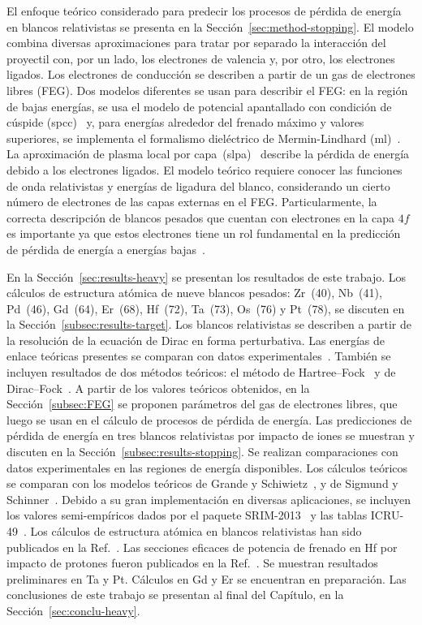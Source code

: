 El enfoque teórico considerado para predecir los procesos de pérdida de 
energía en blancos relativistas se presenta en la 
Sección~\ref{sec:method-stopping}. El modelo combina diversas 
aproximaciones para tratar por separado la interacción del proyectil 
con, por un lado, los electrones de valencia y, por otro, los electrones 
ligados. Los electrones de conducción se describen a partir de un 
gas de electrones libres (FEG). Dos modelos diferentes se usan para 
describir el FEG: en la región de bajas energías, se usa el modelo de 
potencial apantallado con condición de cúspide 
(\acs{spcc})~\cite{Montanari:17} y, para energías alrededor del frenado 
máximo y valores superiores, se implementa el formalismo dieléctrico de 
Mermin-Lindhard (\acs{ml})~\cite{Mermin:70}. La aproximación de plasma 
local por capa~(\acs{slpa})~\cite{Montanari:13} describe la pérdida de 
energía debido a los electrones ligados. El modelo teórico requiere 
conocer las funciones de onda relativistas y energías de ligadura del 
blanco, considerando un cierto número de electrones de las capas 
externas en el FEG. Particularmente, la correcta descripción de blancos 
pesados que cuentan con electrones en la capa $4f$ es importante ya que 
estos electrones tiene un rol fundamental en la predicción de pérdida de 
energía a energías bajas~\cite{Roth:17}. 

En la Sección~\ref{sec:results-heavy} se presentan los resultados de 
este trabajo. Los cálculos de estructura atómica de nueve blancos 
pesados: Zr~(40), Nb~(41), Pd~(46), Gd~(64), Er~(68), Hf~(72), Ta~(73), 
Os~(76) y Pt~(78), se discuten en la 
Sección~\ref{subsec:results-target}. Los blancos relativistas se 
describen a partir de la resolución de la ecuación de Dirac en forma 
perturbativa. Las energías de enlace teóricas presentes se comparan con 
datos experimentales~\cite{Williams:95}. También se incluyen resultados 
de dos métodos teóricos: el método de 
Hartree--Fock~\cite{FroeseFischer:97} y de 
Dirac--Fock~\cite{Desclaux:73}. A partir de los valores teóricos 
obtenidos, en la Sección~\ref{subsec:FEG} se proponen parámetros del gas 
de electrones libres, que luego se usan en el cálculo de procesos de 
pérdida de energía. 
Las predicciones de pérdida de energía en tres blancos relativistas por 
impacto de iones se muestran y discuten en la 
Sección~\ref{subsec:results-stopping}. Se realizan comparaciones con 
datos experimentales en las regiones de energía disponibles. Los 
cálculos teóricos se comparan con los modelos teóricos de Grande y 
Schiwietz~\cite{Grande:01,casp52}, y de Sigmund y 
Schinner~\cite{DPASS20}. Debido a su gran implementación en diversas 
aplicaciones, se incluyen los valores semi-empíricos dados por el 
paquete SRIM-2013~\cite{Ziegler01} y las tablas ICRU-49~\cite{ICRU49}. 
Los cálculos de estructura atómica en blancos relativistas han sido 
publicados en la Ref.~\cite{Mendez:19relat}. Las secciones eficaces de 
potencia de frenado en Hf por impacto de protones fueron publicados en 
la Ref.~\cite{Montanari:20}. Se muestran resultados preliminares en Ta y 
Pt. Cálculos en Gd y Er se encuentran en preparación. Las conclusiones 
de este trabajo se presentan al final del Capítulo, en la 
Sección~\ref{sec:conclu-heavy}.

